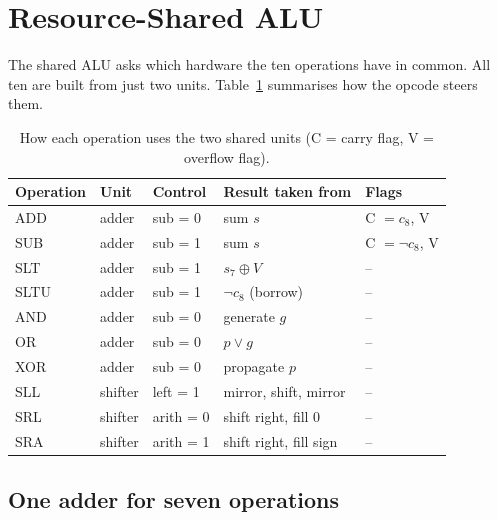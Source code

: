 \documentclass[12pt,a4paper,twoside]{article}
\begin{document}
\section{Resource-Shared ALU}
\label{sec:shared}

The shared ALU asks which hardware the ten operations
have in common. All ten are built from just two units.
Table~\ref{tab:sharing} summarises how the opcode steers them.

\begin{table}[H]
\centering
\caption{How each operation uses the two shared units (C = carry flag, V = overflow flag).}
\label{tab:sharing}
\small\begin{tabular}{@{}lllll@{}}
\toprule
\textbf{Operation} & \textbf{Unit} & \textbf{Control} & \textbf{Result taken from} & \textbf{Flags} \\
\midrule
ADD  & adder   & sub = 0 & sum $s$ & C $= c_8$, V \\
SUB  & adder   & sub = 1 & sum $s$ & C $= \lnot c_8$, V \\
SLT  & adder   & sub = 1 & $s_7 \oplus V$ & -- \\
SLTU & adder   & sub = 1 & $\lnot c_8$ (borrow) & -- \\
AND  & adder   & sub = 0 & generate $g$ & -- \\
OR   & adder   & sub = 0 & $p \lor g$ & -- \\
XOR  & adder   & sub = 0 & propagate $p$ & -- \\
SLL  & shifter & left = 1 & mirror, shift, mirror & -- \\
SRL  & shifter & arith = 0 & shift right, fill 0 & -- \\
SRA  & shifter & arith = 1 & shift right, fill sign & -- \\
\bottomrule
\end{tabular}
\end{table}

\subsection{One adder for seven operations}
\end{document}
